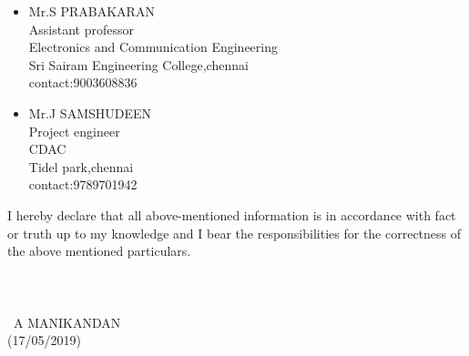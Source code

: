 \documentclass[a4paper,12pt]{memoir} %
\begin{document}
\Sep %






\begin{itemize}
	\item Mr.S PRABAKARAN \\Assistant professor\\Electronics and Communication Engineering \\Sri Sairam Engineering College,chennai\\contact:9003608836\\
	\item Mr.J SAMSHUDEEN \\Project engineer\\CDAC \\Tidel park,chennai\\contact:9789701942

\end{itemize}


\Sep %




\qquad I hereby declare that all above-mentioned information is in accordance with fact or truth up to my knowledge and I bear the responsibilities for the correctness of the above mentioned particulars.\\
\\\\\\\
A MANIKANDAN\\(17/05/2019)

\end{document}
